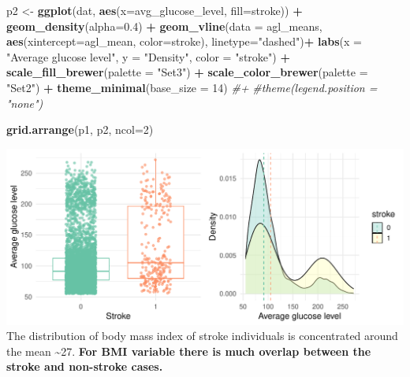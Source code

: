 \documentclass[
]{article}
\newenvironment{Shaded}{\begin{snugshade}}{\end{snugshade}}
\newcommand{\AttributeTok}[1]{\textcolor[rgb]{0.13,0.29,0.53}{#1}}
\newcommand{\CommentTok}[1]{\textcolor[rgb]{0.56,0.35,0.01}{\textit{#1}}}
\newcommand{\DecValTok}[1]{\textcolor[rgb]{0.00,0.00,0.81}{#1}}
\newcommand{\FloatTok}[1]{\textcolor[rgb]{0.00,0.00,0.81}{#1}}
\newcommand{\FunctionTok}[1]{\textcolor[rgb]{0.13,0.29,0.53}{\textbf{#1}}}
\newcommand{\NormalTok}[1]{#1}
\newcommand{\OtherTok}[1]{\textcolor[rgb]{0.56,0.35,0.01}{#1}}
\newcommand{\SpecialCharTok}[1]{\textcolor[rgb]{0.81,0.36,0.00}{\textbf{#1}}}
\newcommand{\StringTok}[1]{\textcolor[rgb]{0.31,0.60,0.02}{#1}}
\begin{document}
\begin{Shaded}
\begin{Highlighting}[]
\NormalTok{p2 }\OtherTok{\textless{}{-}} \FunctionTok{ggplot}\NormalTok{(dat, }\FunctionTok{aes}\NormalTok{(}\AttributeTok{x=}\NormalTok{avg\_glucose\_level, }\AttributeTok{fill=}\NormalTok{stroke)) }\SpecialCharTok{+}  \FunctionTok{geom\_density}\NormalTok{(}\AttributeTok{alpha=}\FloatTok{0.4}\NormalTok{) }\SpecialCharTok{+}
      \FunctionTok{geom\_vline}\NormalTok{(}\AttributeTok{data =}\NormalTok{ agl\_means, }\FunctionTok{aes}\NormalTok{(}\AttributeTok{xintercept=}\NormalTok{agl\_mean, }\AttributeTok{color=}\NormalTok{stroke), }\AttributeTok{linetype=}\StringTok{"dashed"}\NormalTok{)}\SpecialCharTok{+}
      \FunctionTok{labs}\NormalTok{(}\AttributeTok{x =} \StringTok{"Average glucose level"}\NormalTok{, }\AttributeTok{y =} \StringTok{"Density"}\NormalTok{, }\AttributeTok{color =} \StringTok{"stroke"}\NormalTok{) }\SpecialCharTok{+}
      \FunctionTok{scale\_fill\_brewer}\NormalTok{(}\AttributeTok{palette =} \StringTok{"Set3"}\NormalTok{) }\SpecialCharTok{+}
      \FunctionTok{scale\_color\_brewer}\NormalTok{(}\AttributeTok{palette =} \StringTok{"Set2"}\NormalTok{) }\SpecialCharTok{+}
      \FunctionTok{theme\_minimal}\NormalTok{(}\AttributeTok{base\_size =} \DecValTok{14}\NormalTok{) }
      \CommentTok{\#+}
      \CommentTok{\#theme(legend.position = "none")}


\FunctionTok{grid.arrange}\NormalTok{(p1, p2, }\AttributeTok{ncol=}\DecValTok{2}\NormalTok{)}
\end{Highlighting}
\end{Shaded}

\includegraphics{Build-deploy-stroke-prediction-model-R_files/figure-latex/glucose-stroke-hist-1.pdf}
The distribution of body mass index of stroke individuals is
concentrated around the mean \textasciitilde27. \textbf{For BMI variable
there is much overlap between the stroke and non-stroke cases.}
\end{document}
